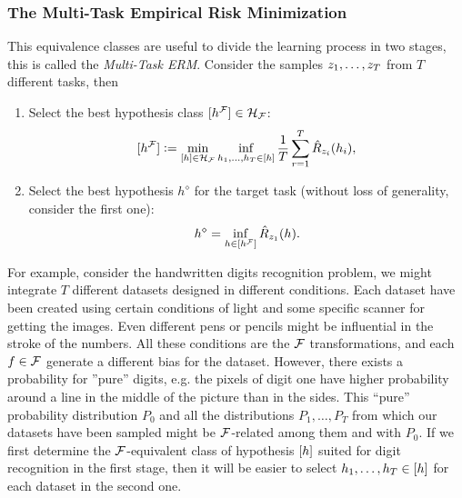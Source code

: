 \subsubsection*{The Multi-Task Empirical Risk Minimization}
This equivalence classes are useful to divide the learning process in two stages, this is called the \emph{Multi-Task ERM}. Consider the samples $z_1, \ldots, z_T$ from $T$ different tasks, then
\begin{enumerate}
    \item Select the best hypothesis class $\lbrack h^{\mathcal{F}}\rbrack \in \mathcal{H}_{\mathcal{F}}$:
    \begin{equation}
        \nonumber
        \lbrack h^{\mathcal{F}}\rbrack \vcentcolon= \min_{\lbrack h\rbrack \in \mathcal{H}_{\mathcal{F}}} \inf_{h_1, \ldots, h_T \in \lbrack h\rbrack} \frac{1}{T} \sum_{r=1}^T \hat{R}_{z_i}(h_i) ,
    \end{equation}
    \item Select the best hypothesis $h^\diamond$ for the target task (without loss of generality, consider the first one):
    \begin{equation}
        \nonumber
        h^\diamond = \inf_{h \in \lbrack h^{\mathcal{F}}\rbrack} \hat{R}_{z_1}(h) .
    \end{equation}
\end{enumerate}

For example, consider the handwritten digits recognition problem, we might integrate $T$ different datasets designed in different conditions. Each dataset have been created using certain conditions of light and some specific scanner for getting the images. Even different pens or pencils might be influential in the stroke of the numbers. All these conditions are the $\mathcal{F}$ transformations, and each $f \in \mathcal{F}$ generate a different bias for the dataset. However, there exists a probability for ''pure'' digits, e.g. the pixels of digit one have higher probability around a line in the middle of the picture than in the sides. This ``pure'' probability distribution $P_0$ and all the distributions $P_1, \ldots, P_T$ from which our datasets have been sampled might be $\mathcal{F}$-related among them and with $P_0$. If we first determine the $\mathcal{F}$-equivalent class of hypothesis $\lbrack h\rbrack$ suited for digit recognition in the first stage, then it will be easier to select $h_1, \ldots, h_T \in \lbrack h\rbrack$ for each dataset in the second one.


